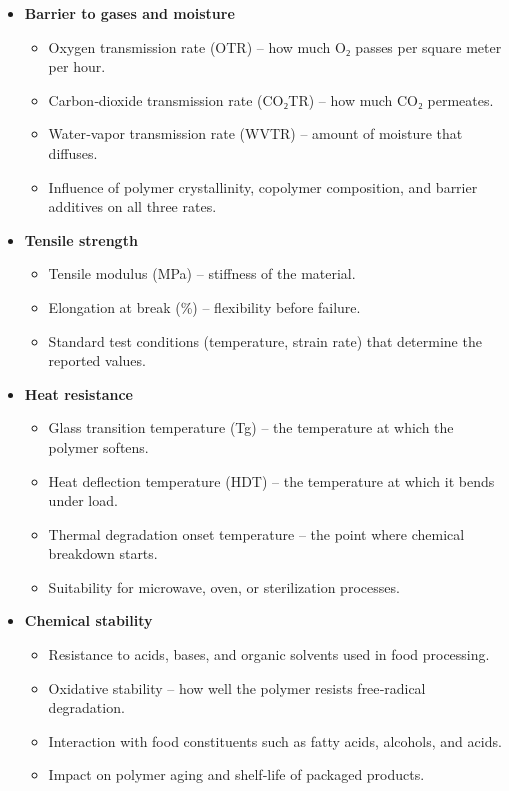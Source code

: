 \documentclass[11pt,a4paper]{article}
\begin{document}
\begin{itemize}
\item 
\textbf{Barrier to gases and moisture}
  \begin{itemize}
\item Oxygen transmission rate (OTR) – how much O₂ passes per square meter per hour.
\item Carbon‑dioxide transmission rate (CO₂TR) – how much CO₂ permeates.
\item Water‑vapor transmission rate (WVTR) – amount of moisture that diffuses.
\item Influence of polymer crystallinity, copolymer composition, and barrier additives on all three rates.
  \end{itemize}
\item 
\textbf{Tensile strength}
  \begin{itemize}
\item Tensile modulus (MPa) – stiffness of the material.
\item Elongation at break (\%) – flexibility before failure.
\item Standard test conditions (temperature, strain rate) that determine the reported values.
  \end{itemize}
\item 
\textbf{Heat resistance}
  \begin{itemize}
\item Glass transition temperature (Tg) – the temperature at which the polymer softens.
\item Heat deflection temperature (HDT) – the temperature at which it bends under load.
\item Thermal degradation onset temperature – the point where chemical breakdown starts.
\item Suitability for microwave, oven, or sterilization processes.
  \end{itemize}
\item 
\textbf{Chemical stability}
  \begin{itemize}
\item Resistance to acids, bases, and organic solvents used in food processing.
\item Oxidative stability – how well the polymer resists free‑radical degradation.
\item Interaction with food constituents such as fatty acids, alcohols, and acids.
\item Impact on polymer aging and shelf‑life of packaged products.
  \end{itemize}

\end{itemize}
\end{document}
